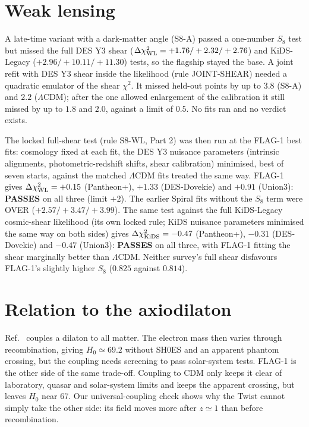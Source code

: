 \documentclass[11pt]{article}
\begin{document}
\section{Weak lensing}\label{sec:wl}
A late-time variant with a dark-matter angle (S8-A) passed a one-number $S_8$ test but missed the full DES Y3 shear
($\Delta\chi^2_{\rm WL}=+1.76/+2.32/+2.76$) and KiDS-Legacy ($+2.96/+10.11/+11.30$) tests, so the flagship stayed the
base. A joint refit with DES Y3 shear inside the likelihood (rule JOINT-SHEAR) needed a quadratic emulator of the shear
$\chi^2$. It missed held-out points by up to $3.8$ (S8-A) and $2.2$ ($\Lambda$CDM); after the one allowed enlargement of
the calibration it still missed by up to $1.8$ and $2.0$, against a limit of $0.5$. No fits ran and no verdict exists.

The locked full-shear test (rule S8-WL, Part 2) was then run at the FLAG-1 best fits: cosmology fixed at each fit, the DES
Y3 nuisance parameters (intrinsic alignments, photometric-redshift shifts, shear calibration) minimised, best of seven
starts, against the matched $\Lambda$CDM fits treated the same way. FLAG-1 gives $\Delta\chi^2_{\rm WL}=+0.15$ (Pantheon+),
$+1.33$ (DES-Dovekie) and $+0.91$ (Union3): \textbf{PASSES} on all three (limit $+2$). The earlier Spiral fits without the
$S_8$ term were OVER ($+2.57/+3.47/+3.99$). The same test against the full KiDS-Legacy cosmic-shear likelihood (its own locked rule; KiDS nuisance parameters
minimised the same way on both sides) gives $\Delta\chi^2_{\rm KiDS}=-0.47$ (Pantheon+), $-0.31$ (DES-Dovekie) and
$-0.47$ (Union3): \textbf{PASSES} on all three, with FLAG-1 fitting the shear marginally better than $\Lambda$CDM. Neither
survey's full shear disfavours FLAG-1's slightly higher $S_8$ ($0.825$ against $0.814$).

\section{Relation to the axiodilaton}
Ref.~\cite{smith2025} couples a dilaton to all matter. The electron mass then varies through recombination, giving
$H_0\simeq69.2$ without SH0ES and an apparent phantom crossing, but the coupling needs screening to pass solar-system
tests. FLAG-1 is the other side of the same trade-off. Coupling to CDM only keeps it clear of laboratory, quasar and
solar-system limits and keeps the apparent crossing, but leaves $H_0$ near 67. Our universal-coupling check shows why
the Twist cannot simply take the other side: its field moves more after $z\simeq1$ than before recombination.
\end{document}

